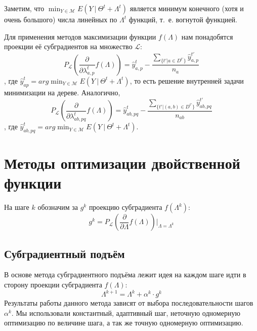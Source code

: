 \documentclass{article}
\begin{document}
Заметим, что $\min_{Y \in \mathcal{M}} E(Y~|~\Theta^t + \Lambda^t)$ является минимум конечного (хотя и очень большого) числа линейных по $\Lambda^t$ функций, т.~е. вогнутой функцией.

Для применения методов максимизации функции $f(\Lambda)$ нам понадобятся проекции её субградиентов на множество $\mathcal{L}$:\\
\begin{equation}
P_{\mathcal{L}} \left( \frac{\partial}{\partial \lambda_{a,p}^t} f(\Lambda) \right ) = \widehat{y}_{a,p}^t - \frac{\sum_{\{t' | a \in D^{t'}\}} \widehat{y}_{a,p}^{t'}}{n_a}
\end{equation}
, где $\widehat{y}_{ap}^t = arg\min_{Y \in \mathcal{M}} E(Y~|~\Theta^t + \Lambda^t)$, то есть решение внутренней задачи минимизации на дереве. Аналогично,
\begin{equation}
P_{\mathcal{L}} \left( \frac{\partial}{\partial \lambda_{ab,pq}^t} f(\Lambda) \right ) = \widehat{y}_{ab,pq}^t - \frac{\sum_{\{t' | (a,b) \in D^{t'}\}} \widehat{y}_{ab,pq}^{t'}}{n_{ab}}
\end{equation}
, где $\widehat{y}_{ab,pq}^t = arg\min_{Y \in \mathcal{M}} E(Y~|~\Theta^t + \Lambda^t)$.

\section{Методы оптимизации двойственной функции}
На шаге $k$ обозначим за $g^k$ проекцию субградиента $f(\Lambda^k)$:
\begin{equation}
g^k = P_{\mathcal{L}} \left( \frac{\partial}{\partial \Lambda} f(\Lambda) \right ) \bigg|_{\Lambda = \Lambda^k}
\end{equation}

\subsection{Субградиентный подъём}
В основе метода субградиентного подъёма лежит идея на каждом шаге идти в сторону проекции субградиента $f(\Lambda)$:
\begin{equation}
\Lambda^{k+1} = \Lambda^k + \alpha^k \cdot g^k
\end{equation}
Результаты работы данного метода зависят от выбора
последовательности шагов $\alpha^k$.
Мы использовали константный, адаптивный шаг, неточную
одномерную оптимизацию по величине шага, а так же
точную одномерную оптимизацию.\\
\end{document}
